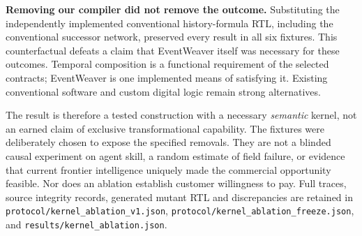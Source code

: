 \textbf{Removing our compiler did not remove the outcome.} Substituting the independently implemented conventional history-formula RTL, including the conventional successor network, preserved every result in all six fixtures. This counterfactual defeats a claim that EventWeaver itself was necessary for these outcomes. Temporal composition is a functional requirement of the selected contracts; EventWeaver is one implemented means of satisfying it. Existing conventional software and custom digital logic remain strong alternatives.

The result is therefore a tested construction with a necessary \emph{semantic} kernel, not an earned claim of exclusive transformational capability. The fixtures were deliberately chosen to expose the specified removals. They are not a blinded causal experiment on agent skill, a random estimate of field failure, or evidence that current frontier intelligence uniquely made the commercial opportunity feasible. Nor does an ablation establish customer willingness to pay. Full traces, source integrity records, generated mutant RTL and discrepancies are retained in \texttt{protocol/kernel\_ablation\_v1.json}, \texttt{protocol/kernel\_ablation\_freeze.json}, and \texttt{results/kernel\_ablation.json}.
